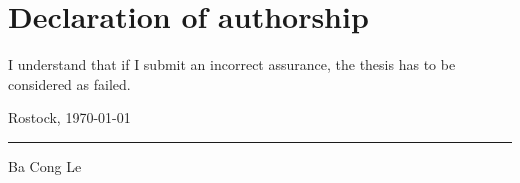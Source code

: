 \chapter*{Declaration of authorship} \label{chap:declareAuthorship}

\renewcommand{\arraystretch}{1.5}


I understand that if I submit an incorrect assurance, the thesis has to be considered as failed.



\vspace{5mm}
\noindent
Rostock, \today

\vspace{20mm}
\noindent
\rule{5cm}{0.5pt}
\newline
Ba Cong Le
